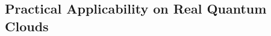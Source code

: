 \documentclass[runningheads]{llncs}
\begin{document}


\subsection{Practical Applicability on Real Quantum Clouds}
\label{sec:applicability}
\end{document}

